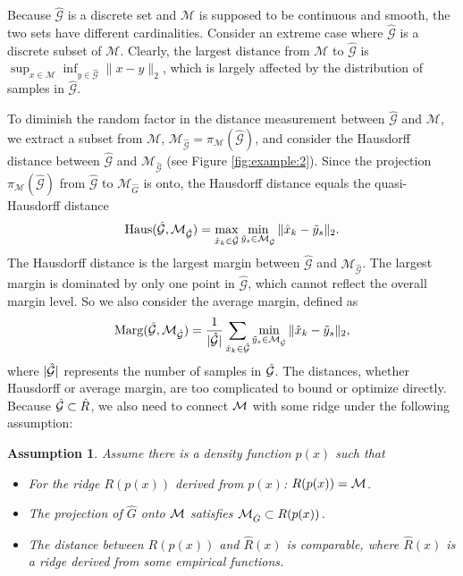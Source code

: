 \documentclass[aos,preprint]{imsart}
\newcommand{\Yao}[1]{{\textcolor{red}{[Yao: #1]}}}%
\newtheorem{assumption}[theorem]{Assumption}
\theoremstyle{remark}
\begin{document}
Because $\hat{\mathcal G}$ is a discrete set and $\mathcal M$ is supposed to be continuous and smooth, the two sets have different cardinalities. Consider an extreme case where $\hat{\mathcal G}$ is a discrete subset of $\mathcal M$. Clearly, the largest distance from $\mathcal M$ to $\hat{\mathcal G}$ is $\sup_{x\in \mathcal M}\inf_{y\in\hat{\mathcal G}} \|x-y\|_2$, which is largely affected by the distribution of samples in $\hat{\mathcal G}$.

To diminish the random factor in the distance measurement between $\hat{\mathcal G}$ and $\mathcal M$, we extract a subset from $\mathcal M$, ${\mathcal M}_{\hat{\mathcal G}}=\pi_{\mathcal M}(\hat{\mathcal G})$, and consider the Hausdorff distance between ${\hat{\mathcal G}}$ and ${\mathcal M}_{\hat{\mathcal G}}$ (see Figure \ref{fig:example:2}). Since the projection $\pi_{\mathcal M}(\hat{\mathcal G})$ from $\hat{\mathcal G}$ to $\mathcal M_{\hat{G}}$ is onto, the Hausdorff distance equals the quasi-Hausdorff distance
\begin{equation}\label{Hausd}
{\rm Haus}({\hat{\mathcal G}}, {\mathcal M}_{\hat{\mathcal G}}) = \max_{\hat{x}_k\in \hat{\mathcal G}} \min_{\tilde{y}_s\in {\mathcal M}_{\hat{\mathcal G}}}\|\hat{x}_k-\tilde{y}_s\|_2.
\end{equation}
The Hausdorff distance is the largest margin between $\hat{\mathcal G}$ and ${\mathcal M}_{\hat{\mathcal G}}$. The largest margin is dominated by only one point in $\hat{\mathcal G}$, which cannot reflect the overall margin level. So we also consider the average margin, defined as
\begin{equation}\label{margin}
{\rm Marg}({\hat{\mathcal G}, {\mathcal M}_{\hat{\mathcal G}}}) = \frac{1}{|\hat{\mathcal G}|} \sum_{\hat{x}_k\in \hat{\mathcal G}} \min_{\tilde{y}_s\in {\mathcal M}_{\hat{\mathcal G}}}\|\hat{x}_k-\tilde{y}_s\|_2,
\end{equation}
where $|\cal \hat{G}|$ represents the number of samples in $\cal \hat{G}$.
The distances, whether Hausdorff or average margin, are too complicated to bound or optimize directly. Because $\hat{\cal G}\subset \hat{R}$,  we also need to connect $\cal M$ with some ridge under the following assumption:
\begin{assumption}\label{Data_assumption}
Assume there is a density function $p(x)$ such that 
\begin{itemize}
\item[1.] For the ridge $R(p(x))$ derived from $p(x)$: $R(p(x))={\cal M}$.
\item[2.] The projection of $\hat{G}$ onto ${\cal M}$ satisfies ${\cal M}_{\hat{G}}\subset R(p(x))$.
\item[3.] The distance between $R(p(x))$ and $\hat{R}(x)$ is comparable, where $\hat{R}(x)$ is a ridge derived from some empirical functions.
\end{itemize}
\end{assumption}
\end{document}
